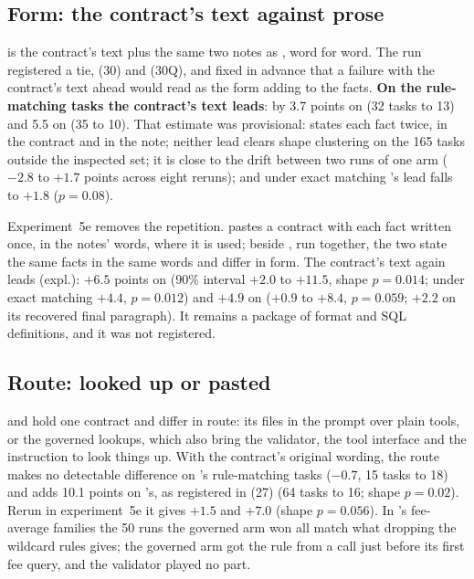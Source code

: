 \subsection{Form: the contract's text against prose}
\label{sec:alike}

\armTws{} is the contract's text plus the same two notes as \armMws{},
word for word. The run registered a tie, (30) and (30Q), and fixed in
advance that a failure with the contract's text ahead would read as the
form adding to the facts. \textbf{On the rule-matching tasks the
contract's text leads}: by 3.7 points on \mLuna{} (32 tasks to 13) and 5.5
on \mQwen{} (35 to 10). That estimate was provisional: \armTws{} states
each fact twice, in the contract and in the note; neither lead clears
shape clustering on the 165 tasks outside the inspected set; it is close
to the drift between two runs of one arm ($-2.8$ to $+1.7$ points across
eight reruns); and under exact matching \mLuna{}'s lead falls to $+1.8$
($p{=}0.08$).

Experiment~5e removes the repetition. \armTp{} pastes a contract with each
fact written once, in the notes' words, where it is used; beside
\armMws{}, run together, the two state the same facts in the same words
and differ in form. The contract's text again leads (expl.): $+6.5$ points
on \mLuna{} (90\% interval $+2.0$ to $+11.5$, shape $p{=}0.014$; under
exact matching $+4.4$, $p{=}0.012$) and $+4.9$ on \mQwen{} ($+0.9$ to
$+8.4$, $p{=}0.059$; $+2.2$ on its recovered final paragraph). It remains a
package of format and SQL definitions, and it was not registered.

\subsection{Route: looked up or pasted}
\label{sec:tools-add}

\armT{} and \armC{} hold one contract and differ in route: its files in
the prompt over plain tools, or the governed lookups, which also bring the
validator, the tool interface and the instruction to look things up.
With the contract's original wording, the route
makes no detectable difference on \mLuna{}'s rule-matching tasks ($-0.7$,
15 tasks to 18) and adds 10.1 points on \mQwen{}'s, as registered in (27)
(64 tasks to 16; shape $p{=}0.02$). Rerun in experiment~5e it gives $+1.5$
and $+7.0$ (shape $p{=}0.056$). In \mLuna{}'s fee-average families the 50
runs the governed arm won all match what dropping the wildcard rules gives;
the governed arm got the rule from a call just before its first fee query,
and the validator played no part.

